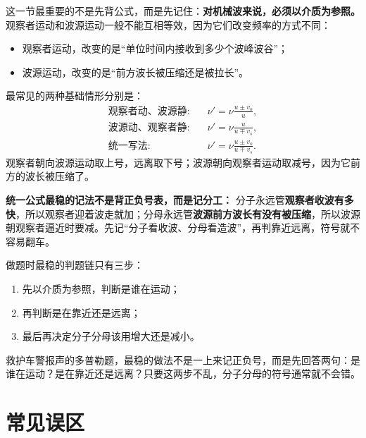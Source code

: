\documentclass[lang=cn,11pt]{elegantbook}
\begin{document}
这一节最重要的不是先背公式，而是先记住：\textbf{对机械波来说，必须以介质为参照。} 观察者运动和波源运动一般不能互相等效，因为它们改变频率的方式不同：
\begin{itemize}
  \item 观察者运动，改变的是“单位时间内接收到多少个波峰波谷”；
  \item 波源运动，改变的是“前方波长被压缩还是被拉长”。
\end{itemize}

最常见的两种基础情形分别是：
\[
\begin{aligned}
\text{观察者动、波源静:}\quad &\nu'=\nu\frac{u\pm v_o}{u},\\
\text{波源动、观察者静:}\quad &\nu'=\nu\frac{u}{u\mp v_s},\\
\text{统一写法:}\quad &\nu'=\nu\frac{u\pm v_o}{u\mp v_s}.
\end{aligned}
\]
观察者朝向波源运动取上号，远离取下号；波源朝向观察者运动取减号，因为它前方的波长被压缩了。

\begin{note}
\textbf{统一公式最稳的记法不是背正负号表，而是记分工：} 分子永远管\textbf{观察者收波有多快}，所以观察者迎着波走就加；分母永远管\textbf{波源前方波长有没有被压缩}，所以波源朝观察者逼近时要减。先记“分子看收波、分母看造波”，再判靠近远离，符号就不容易翻车。
\end{note}

做题时最稳的判题链只有三步：
\begin{enumerate}
  \item 先以介质为参照，判断是谁在运动；
  \item 再判断是在靠近还是远离；
  \item 最后再决定分子分母该用增大还是减小。
\end{enumerate}

\begin{example}[多普勒题先别急着套总公式]
救护车警报声的多普勒题，最稳的做法不是一上来记正负号，而是先回答两句：是谁在运动？是在靠近还是远离？只要这两步不乱，分子分母的符号通常就不会错。
\end{example}

\section{常见误区}
\end{document}
